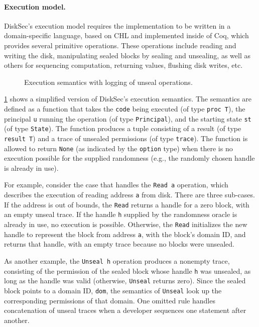 \paragraph{Execution model.}

DiskSec's execution model requires the implementation to be written in a
domain-specific language, based on CHL and implemented inside of Coq,
which provides several primitive operations.  These operations include
reading and writing the disk, manipulating sealed blocks by sealing and
unsealing, as well as others for sequencing computation, returning values,
flushing disk writes, etc.

\begin{figure}[ht]
  
  \caption{Execution semantics with logging of unseal operations.}
  \label{fig:exec}
\end{figure}

\ref{fig:exec} shows a simplified version of DiskSec's execution
semantics.  The semantics are defined as a function that takes the
\texttt{code} being executed (of type \texttt{proc T}), the principal \texttt{u}
running the operation (of type \texttt{Principal}), and the starting state \texttt{st}
(of type \texttt{State}).  The function
produces a tuple consisting of a result (of type \texttt{result T}) and
a trace of unsealed permissions (of type \texttt{trace}).  The function
is allowed to return \texttt{None} (as indicated by the \texttt{option} type)
when there is no execution possible for the supplied randomness (e.g.,
the randomly chosen handle is already in use).

For example, consider the case that handles the \texttt{Read a} operation,
which describes the execution of reading address \texttt{a} from disk.
There are three sub-cases.  If the address is out of bounds, the \texttt{Read}
returns a handle for a zero block, with an empty unseal trace.  If the handle
\texttt{h} supplied by the randomness oracle is already in use, no execution
is possible.  Otherwise, the \texttt{Read} initializes the new handle to
represent the block from address \texttt{a}, with the block's domain ID, and
returns that handle, with an empty trace because no blocks were unsealed.

As another example, the \texttt{Unseal h} operation produces a nonempty trace,
consisting of the permission of the sealed block whose handle \texttt{h}
was unsealed, as long as the handle was valid (otherwise, \texttt{Unseal}
returns zero).  Since the sealed block points to a domain ID, \texttt{dom},
the semantics of \texttt{Unseal} look up the corresponding permissions of
that domain.  One omitted rule handles concatenation of unseal traces when a
developer sequences one statement after another.

